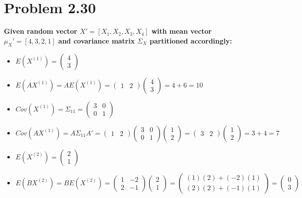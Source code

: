 \documentclass{article}
\begin{document}
\section*{Problem 2.30}
\noindent \textbf{Given random vector $X' = [X_1, X_2, X_3, X_4]$ with mean vector $\mu_X' = [4, 3, 2, 1]$ and covariance matrix $\Sigma_X$ partitioned accordingly:}
\begin{itemize}
    \item[(a)] $E(X^{(1)}) = \begin{pmatrix}4\\ 3\end{pmatrix}$
    \item[(b)] $E(AX^{(1)}) = A E(X^{(1)}) = \begin{pmatrix}1 & 2\end{pmatrix}\begin{pmatrix}4\\ 3\end{pmatrix} = 4 + 6 = 10$
    \item[(c)] $Cov(X^{(1)}) = \Sigma_{11} = \begin{pmatrix}3&0\\ 0&1\end{pmatrix}$
    \item[(d)] $Cov(AX^{(1)}) = A \Sigma_{11} A' = \begin{pmatrix}1 & 2\end{pmatrix}\begin{pmatrix}3&0\\ 0&1\end{pmatrix}\begin{pmatrix}1\\ 2\end{pmatrix} = \begin{pmatrix}3 & 2\end{pmatrix}\begin{pmatrix}1\\ 2\end{pmatrix} = 3 + 4 = 7$
    \item[(e)] $E(X^{(2)}) = \begin{pmatrix}2\\ 1\end{pmatrix}$
    \item[(f)] $E(BX^{(2)}) = B E(X^{(2)}) = \begin{pmatrix}1&-2\\ 2&-1\end{pmatrix}\begin{pmatrix}2\\ 1\end{pmatrix} = \begin{pmatrix}(1)(2) + (-2)(1)\\ (2)(2) + (-1)(1)\end{pmatrix} = \begin{pmatrix}0\\ 3\end{pmatrix}$

\end{itemize}
\end{document}
